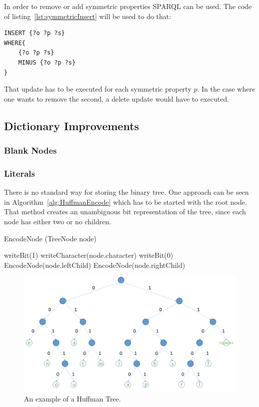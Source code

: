 In order to remove or add symmetric properties SPARQL can be used. The code of listing~\ref{lst:symmetricInsert} will be used to do that:

\begin{lstlisting}[captionpos=b, caption=SPARQL query for adding triples with the symmetric property p, label=lst:symmetricInsert,
basicstyle=\ttfamily,frame=single]
INSERT {?o ?p ?s}
WHERE{
	{?o ?p ?s}
	MINUS {?o ?p ?s}
}
\end{lstlisting}

That update has to be executed for each symmetric property $p$. In the case where one wants to remove the second, a delete update would have to executed.

\subsection{Dictionary Improvements}\label{sec:implementationDictImprovements}

\subsubsection{Blank Nodes}\label{sec:implementationBlankNodes}

\subsubsection{Literals}\label{sec:implementationLiterals}

There is no standard way for storing the binary tree. One approach can be seen in Algorithm~\ref{alg:HuffmanEncode} which has to be started with the root node. That method creates an unambiguous bit representation of the tree, since each node has either two or no children.

\begin{algorithm}
	\caption{EncodeNode (TreeNode node)}\label{alg:HuffmanEncode}
	\begin{algorithmic}[1]
		\State writeBit(1)
		\State writeCharacter(node.character)
		\Else
		\State writeBit(0)
		\State EncodeNode(node.leftChild)
		\State EncodeNode(node.rightChild)
		\EndIf
	\end{algorithmic}
\end{algorithm}

\begin{figure}
	\centering
	\includegraphics[width=0.9\linewidth]{figures/4_rdf_specific_features/huffman}
	\caption{An example of a Huffman Tree.}
	\label{fig:huffmantree}
\end{figure}


